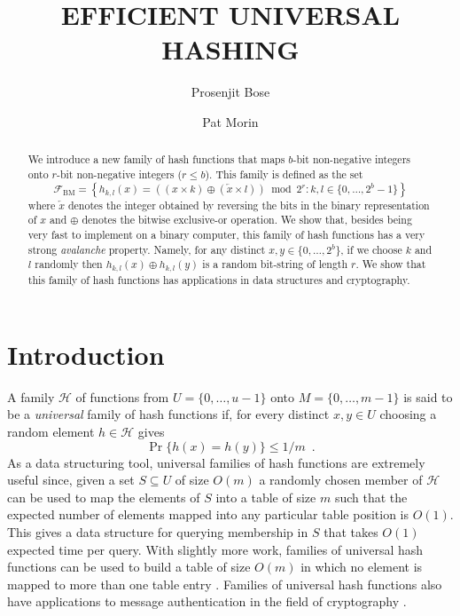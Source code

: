\documentclass[lotsofwhite,charterfonts]{patmorin}
\title{\MakeUppercase{Efficient Universal Hashing}}
\author{Prosenjit Bose \and Pat Morin}
\date{}
\newcommand{\xor}{\oplus}
\newcommand{\rev}[1]{\overleftarrow{#1}}
\begin{document}
\maketitle
\begin{abstract}
We introduce a new family of hash functions that maps $b$-bit
non-negative integers onto $r$-bit non-negative integers ($r\le b$).
This family is defined as the set
\[
 \mathcal{F}_\mathrm{BM} = \left\{ h_{k,l}(x)=((x\times k) \xor (\rev{x}\times
l))\bmod 2^r :
k,l\in\{0,\ldots,2^b-1\} \right\} 
\]
where $\rev{x}$ denotes the integer obtained by reversing the bits in
the binary representation of $x$ and $\xor$ denotes the bitwise
exclusive-or operation.  We show that, besides being very fast to
implement on a binary computer, this family of hash functions has a
very strong \emph{avalanche} property.  Namely, for any distinct
$x,y\in\{0,\ldots,2^b\}$, if we choose $k$ and $l$ randomly then
$h_{k,l}(x)\xor h_{k,l}(y)$ is a random bit-string of length $r$.  We
show that this family of hash functions has applications in data
structures and cryptography.  
\end{abstract}


\section{Introduction}

A family $\mathcal{H}$ of functions from $U=\{0,\ldots,u-1\}$ onto
$M=\{0,\ldots,m-1\}$ is said to be a \emph{universal} family of hash
functions if, for every distinct $x,y\in U$ choosing a random element
$h\in \mathcal{H}$ gives
\[
    \Pr\{h(x)=h(y)\} \le 1/m \enspace .
\]
As a data structuring tool, universal families of hash functions are
extremely useful since, given a set $S\subseteq U$ of size $O(m)$ a
randomly chosen member of $\mathcal{H}$ can be used to map the
elements of $S$ into a table of size $m$ such that the expected number
of elements mapped into any particular table position is $O(1)$.  This
gives a data structure for querying membership in $S$ that takes
$O(1)$ expected time per query.  With slightly more work, families of
universal hash functions can be used to build a table of size $O(m)$
in which no element is mapped to more than one table entry
\cite{fksXX,clrsXX}.  Families of universal hash functions also have
applications to message authentication in the field of cryptography
\cite{cXX,cXX,cXX}.
\end{document}
